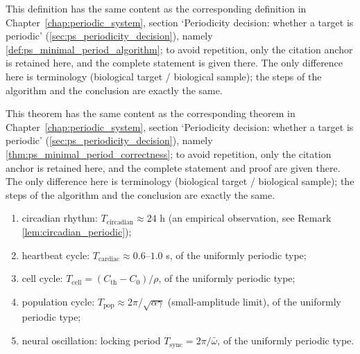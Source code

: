 \begin{definition}\label{def:bio_minimal_period_algorithm}
This definition has the same content as the corresponding definition in Chapter~\ref{chap:periodic_system}, section `Periodicity decision: whether a target is periodic' (\cref{sec:ps_periodicity_decision}), namely \cref{def:ps_minimal_period_algorithm}; to avoid repetition, only the citation anchor is retained here, and the complete statement is given there. The only difference here is terminology (biological target / biological sample); the steps of the algorithm and the conclusion are exactly the same.
\end{definition}

\begin{theorem}\label{thm:bio_minimal_period_correctness}
This theorem has the same content as the corresponding theorem in Chapter~\ref{chap:periodic_system}, section `Periodicity decision: whether a target is periodic' (\cref{sec:ps_periodicity_decision}), namely \cref{thm:ps_minimal_period_correctness}; to avoid repetition, only the citation anchor is retained here, and the complete statement and proof are given there. The only difference here is terminology (biological target / biological sample); the steps of the algorithm and the conclusion are exactly the same.
\end{theorem}

\begin{example}\label{ex:bio_periodic_examples}
\begin{enumerate}[label=(\roman*)]
    \item circadian rhythm: $T_{\text{circadian}}\approx 24$ h (an empirical observation, see Remark \ref{lem:circadian_periodic});
    \item heartbeat cycle: $T_{\text{cardiac}}\approx 0.6$--$1.0$ s, of the uniformly periodic type;
    \item cell cycle: $T_{\text{cell}}=(C_{\text{th}}-C_0)/\rho$, of the uniformly periodic type;
    \item population cycle: $T_{\text{pop}}\approx 2\pi/\sqrt{\alpha\gamma}$ (small-amplitude limit), of the uniformly periodic type;
    \item neural oscillation: locking period $T_{\text{sync}}=2\pi/\bar\omega$, of the uniformly periodic type.
\end{enumerate}
\end{example}

